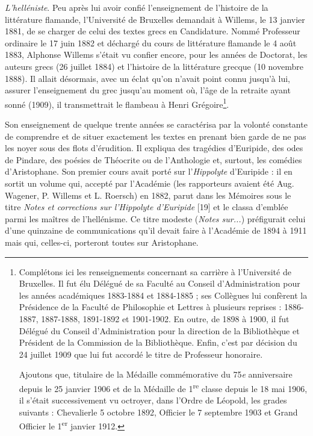 \documentclass{book}%
\newcommand{\italique}[1]{\textit{#1}}%
\newcommand{\nieme}[1]{#1\italique{e}}%
\newcommand{\expo}[1]{\textsuperscript{#1}}%
\newcommand{\note}[1]{\footnote{#1}}
\begin{document}
\italique{L'helléniste}. Peu après lui avoir confié l'enseignement de l'histoire de la littérature flamande, l'Université de Bruxelles demandait à Willems, le 13 janvier 1881, de se charger de celui des textes grecs en Candidature.
Nommé Professeur ordinaire le 17 juin 1882 et déchargé du cours de littérature flamande le 4 août 1883, Alphonse Willems s'était vu confier encore, pour les années de Doctorat, les auteurs grecs (26 juillet 1884) et l'histoire de la littérature grecque (10 novembre 1888).
Il allait désormais, avec un éclat qu'on n'avait point connu jusqu'à lui, assurer l'enseignement du grec jusqu'au moment où, l'âge de la retraite ayant sonné (1909), il transmettrait le flambeau à Henri Grégoire\note{Complétons ici les renseignements concernant sa carrière à l'Université de Bruxelles. Il fut élu Délégué de sa Faculté au Conseil d'Administration pour les années académiques 1883-1884 et 1884-1885 ; ses Collègues lui confèrent la Présidence de la Faculté de Philosophie et Lettres à plusieurs reprises : 1886- 1887, 1887-1888, 1891-1892 et 1901-1902. En outre, de 1898 à 1900, il fut Délégué du Conseil d'Administration pour la direction de la Bibliothèque et Président de la Commission de la Bibliothèque. Enfin, c'est par décision du 24 juillet 1909 que lui fut accordé le titre de Professeur honoraire. 
	
Ajoutons que, titulaire de la Médaille commémorative du \nieme{75} anniversaire depuis le 25 janvier 1906 et de la Médaille de 1\expo{re} classe depuis le 18 mai 1906, il s'était successivement vu octroyer, dans l'Ordre de Léopold, les grades suivants : Chevalierle 5 octobre 1892, Officier le 7 septembre 1903 et Grand Officier le 1\expo{er} janvier 1912.}. 

Son enseignement de quelque trente années se caractérisa par la volonté constante de comprendre et de situer exactement les textes en prenant bien garde de ne pas les noyer sous des flots d'érudition.
Il expliqua des tragédies d'Euripide, des odes de Pindare, des poésies de Théocrite ou de l'Anthologie et, surtout, les comédies d'Aristophane.
Son premier cours avait porté sur l'\italique{Hippolyte} d'Euripide : il en sortit un volume qui, accepté par l'Académie (les rapporteurs avaient été Aug. Wagener, P. Willems et L. Roersch) en 1882, parut dans les Mémoires sous le titre \italique{Notes et corrections sur l'Hippolyte d'Euripide} [19] et le classa d'emblée parmi les maîtres de l'hellénisme.
Ce titre modeste (\italique{Notes sur...}) préfigurait celui d'une quinzaine de communications qu'il devait faire à l'Académie de 1894 à 1911 mais qui, celles-ci, porteront toutes sur Aristophane.
\end{document}
